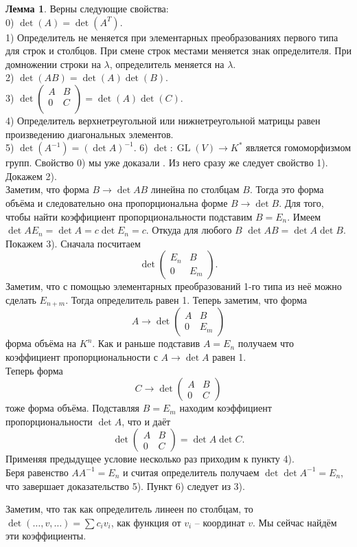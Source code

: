 \documentclass[10pt,a4paper,oneside]{book} %
\theoremstyle{definition}
\newtheorem{lem}{Лемма}
\newcommand{\GL}{\operatorname{GL}}
\def\lm{\begin{lem}}
\def\elm{\end{lem}}
\def\pmat{\begin{pmatrix}}
\def\epmat{\end{pmatrix}}
\begin{document}
\lm Верны следующие свойства:\\
0) $\det(A)=\det(A^{T})$.\\
1) Определитель не меняется при элементарных преобразованиях первого типа для строк и столбцов. При смене строк местами меняется знак определителя. При домножении строки на $\lambda$, определитель меняется на $\lambda$.\\
2) $\det(AB)=\det(A)\det(B)$.\\
3) $\det \left(\begin{matrix}A & B\\
0 & C \\
\end{matrix}\right)= \det(A)\det(C)$.\\
4) Определитель верхнетреугольной или нижнетреугольной матрицы равен произведению диагональных элементов.\\
5) $\det (A^{-1})=(\det A)^{-1}.$
6) $\det \colon \GL(V) \to K^*$
является гомоморфизмом групп.
\proof Свойство 0) мы уже доказали . Из него сразу же следует свойство 1). Докажем 2).\\
Заметим, что форма $B \to \det AB$ линейна по столбцам $B$. Тогда это форма объёма и следовательно она пропорциональна форме $B \to\det B$. Для того, чтобы найти коэффициент пропорциональности подставим $B=E_n$. Имеем $\det AE_n=\det A= c \det E_n=c$. Откуда для любого $B$ $\det AB=\det A \det B$.\\
Покажем 3). Сначала посчитаем $$\det \pmat E_n& B\\
0& E_m\epmat.$$
Заметим, что с помощью элементарных преобразований 1-го типа из неё можно сделать $E_{n+m}$. Тогда определитель равен 1.
Теперь заметим, что форма $$A \to \det \pmat A & B\\ 0& E_m\epmat $$ форма объёма на $K^n$. Как и раньше подставив $A=E_n$ получаем что коэффициент пропорциональности с $A \to \det A$ равен 1.\\
Теперь форма $$C \to \det \pmat A& B\\ 0 & C \epmat $$ тоже форма объёма. Подставляя $B=E_m$ находим коэффициент пропорциональности $\det A$, что и даёт 
$$\det \pmat A&B\\ 0&C \epmat = \det A \det C.$$
 Применяя предыдущее условие несколько раз приходим к пункту 4).\\
Беря равенство $AA^{-1}=E_n $ и считая определитель получаем $\det \det A^{-1}=E_n$, что завершает доказательство 5). Пункт 6) следует из 3).
\endproof
\elm


Заметим, что так как определитель линеен по столбцам, то $\det (\dots,v,\dots)= \sum c_i v_i$, как функция от $v_i$ -- координат $v$. Мы сейчас найдём эти коэффициенты. 
\end{document}
